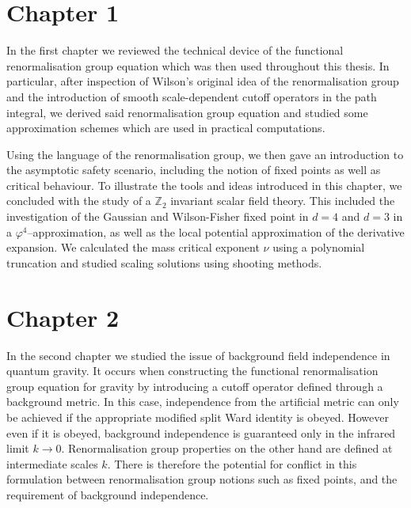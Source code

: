 \documentclass[11pt]{book}
\numberwithin{equation}{chapter}
\begin{document}
\section*{Chapter 1}

In the first chapter we reviewed the technical device of the functional renormalisation
group equation which was then used throughout this thesis.
In particular, after inspection
of Wilson's original idea of the renormalisation group and the introduction
of smooth scale-dependent cutoff operators in the path integral, we derived
said renormalisation group equation and studied some approximation schemes
which are used in practical computations.

Using the language of the renormalisation group, we then gave an introduction
to the asymptotic safety scenario, including the notion of fixed points
as well as critical behaviour. To illustrate the tools and ideas introduced
in this chapter, we concluded with the study of a $\mathbb Z_2$ invariant
scalar field theory. This included the investigation of the
Gaussian and Wilson-Fisher fixed point in $d=4$ and $d=3$ in a
$\varphi^4$--approximation, as well as the local potential approximation
of the derivative expansion.
We calculated the mass critical exponent $\nu$ using a polynomial truncation
and studied scaling solutions using shooting methods.

\section*{Chapter 2}

In the second chapter we studied the issue of background field independence in quantum gravity.
It occurs when constructing the functional renormalisation group equation for gravity by introducing a
cutoff operator defined through a background metric. In this case, independence from the artificial
metric can only be achieved if the appropriate modified split Ward identity is obeyed.
However even if it is obeyed, background independence is guaranteed
only in the infrared limit $k\to0$.
Renormalisation group properties on the other hand are defined at intermediate scales $k$.
There is therefore the potential for conflict in this formulation between
renormalisation group notions such as fixed points,
and the requirement of background independence.
\end{document}

